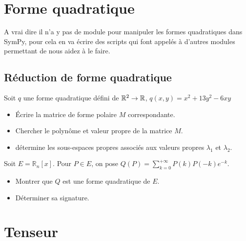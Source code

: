 \section{Forme quadratique}
A vrai dire il n'a y pas de module pour manipuler les formes quadratiques dans SymPy, pour cela en va écrire
des scripts qui font appelés à d'autres modules permettant de nous aidez à le faire.

\subsection{Réduction de forme quadratique}
\begin{exercise}
Soit $q$ une forme quadratique défini de $\mathbb{R}^2 \to \mathbb{R}$, $q(x,y) = x^2 + 13 y^2 - 6xy$
\begin{itemize}
  \item Écrire la matrice de forme polaire $M$ correspondante.
  \item Chercher le polynôme et valeur propre de la matrice $M$.
  \item détermine les sous-espaces propres associés aux valeurs propres $\lambda_{1}$ et $\lambda_{2}$.
\end{itemize}
\end{exercise}

\begin{exercise}
Soit $E=\mathbb{R}_{n}\left[x\right]$. Pour $P\in E$, on pose $Q\left(P\right)= \sum_{k=0}^{+\infty}P\left(k\right)P\left(-k\right)e^{-k}$. 
\begin{itemize}
  \item Montrer que $Q$ est une forme quadratique de $E$.
  \item Déterminer sa signature.
\end{itemize}
\end{exercise}
\section{Tenseur}




